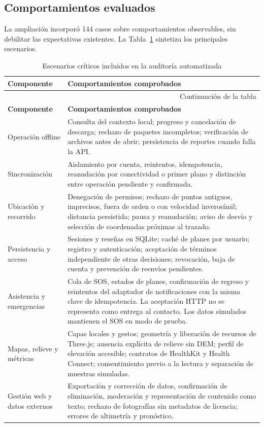 \subsection{Comportamientos evaluados}

La ampliación incorporó 144 casos sobre comportamientos observables, sin debilitar las expectativas existentes. La Tabla~\ref{tab:technical-validation} sintetiza los principales escenarios.

\begingroup
\small
\setlength{\tabcolsep}{4pt}
\renewcommand{\arraystretch}{1.12}
\begin{longtable}{|p{3.1cm}|p{11.1cm}|}
\caption{Escenarios críticos incluidos en la auditoría automatizada}\label{tab:technical-validation} \\
\hline
\textbf{Componente} & \textbf{Comportamientos comprobados} \\
\hline
\endfirsthead
\multicolumn{2}{r}{\footnotesize Continuación de la tabla} \\
\hline
\textbf{Componente} & \textbf{Comportamientos comprobados} \\
\hline
\endhead
\hline
\endfoot
\hline
\endlastfoot
Operación offline & Consulta del contexto local; progreso y cancelación de descarga; rechazo de paquetes incompletos; verificación de archivos antes de abrir; persistencia de reportes cuando falla la API. \\
\hline
Sincronización & Aislamiento por cuenta, reintentos, idempotencia, reanudación por conectividad o primer plano y distinción entre operación pendiente y confirmada. \\
\hline
Ubicación y recorrido & Denegación de permisos; rechazo de puntos antiguos, imprecisos, fuera de orden o con velocidad inverosímil; distancia persistida; pausa y reanudación; aviso de desvío y selección de coordenadas próximas al trazado. \\
\hline
Persistencia y acceso & Sesiones y reseñas en SQLite; caché de planes por usuario; registro y autenticación; aceptación de términos independiente de otras decisiones; revocación, baja de cuenta y prevención de reenvíos pendientes. \\
\hline
Asistencia y emergencias & Cola de SOS, estados de planes, confirmación de regreso y reintentos del adaptador de notificaciones con la misma clave de idempotencia. La aceptación HTTP no se representa como entrega al contacto. Los datos simulados mantienen el SOS en modo de prueba. \\
\hline
Mapas, relieve y métricas & Capas locales y gestos; geometría y liberación de recursos de Three.js; ausencia explícita de relieve sin DEM; perfil de elevación accesible; contratos de HealthKit y Health Connect; consentimiento previo a la lectura y separación de muestras simuladas. \\
\hline
Gestión web y datos externos & Exportación y corrección de datos, confirmación de eliminación, moderación y representación de contenido como texto; rechazo de fotografías sin metadatos de licencia; errores de altimetría y pronóstico. \\
\hline
\end{longtable}
\endgroup

